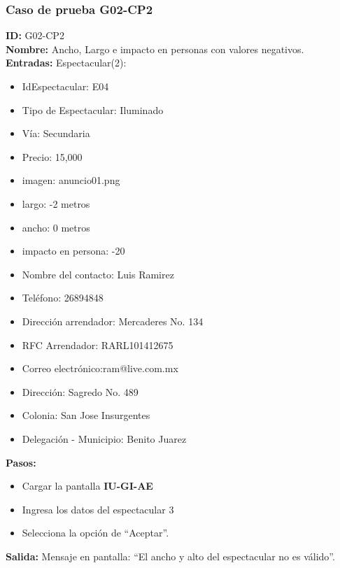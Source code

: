 \subsubsection{Caso de prueba G02-CP2}
\textbf{ID:} G02-CP2\\
\textbf{Nombre:} Ancho, Largo e impacto en personas con valores negativos.\\
\textbf{Entradas:}
Espectacular(2):
\begin{itemize}
    \item IdEspectacular: E04
    \item Tipo de Espectacular: Iluminado
    \item Vía: Secundaria
    \item Precio: 15,000
    \item imagen: anuncio01.png
    \item largo: -2 metros
    \item ancho: 0 metros
    \item impacto en persona: -20
    \item Nombre del contacto: Luis Ramirez
    \item Teléfono: 26894848
    \item Dirección arrendador: Mercaderes No. 134
    \item RFC Arrendador: RARL101412675
    \item Correo electrónico:ram@live.com.mx
    \item Dirección: Sagredo No. 489
    \item Colonia: San Jose Insurgentes
    \item Delegación - Municipio: Benito Juarez
\end{itemize}
\textbf{Pasos:}
\begin{itemize}
    \item Cargar la pantalla \textbf{IU-GI-AE}
    \item Ingresa los datos del espectacular 3
    \item Selecciona la opción de ``Aceptar''.
\end{itemize}
\textbf{Salida:}
Mensaje en pantalla: ``El ancho y alto del espectacular no es válido''. 

